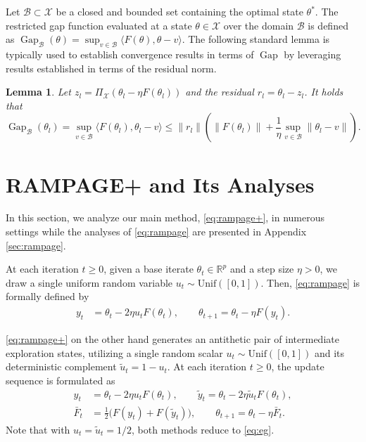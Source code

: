 \documentclass[letter,11pt]{article}
\newtheorem{lemma}[]{Lemma}
\begin{document}
Let $\mathcal{B} \subset \mathcal{X}$ be a closed and bounded set containing the optimal state $\theta^*$. The restricted gap function evaluated at a state $\theta \in \mathcal{X}$ over the domain $\mathcal{B}$ is defined as $\operatorname{Gap}_{\mathcal{B}}(\theta) = \sup_{v \in \mathcal{B}} \langle F(\theta), \theta - v \rangle$. The following standard lemma \cite{Konnov2001,Facchinei2003,nesterov2007dual} is typically used to establish convergence results in terms of $\operatorname{Gap}$ by leveraging results established in terms of the residual norm.
\begin{lemma}\label{lem:gap}
 Let $z_l = \Pi_{\mathcal{X}}(\theta_l - \eta F(\theta_l))$ and the residual $r_l = \theta_l - z_l$. It holds that
 \begin{equation}
\operatorname{Gap}_{\mathcal{B}}(\theta_l) =\sup_{v \in \mathcal{B}} \langle F(\theta_l), \theta_l - v \rangle\le \|r_l\| \left( \|F(\theta_l)\| + \frac{1}{\eta} \sup_{v \in \mathcal{B}} \|\theta_l - v\| \right).
\end{equation}
\end{lemma}
\section{RAMPAGE+ and Its Analyses}\label{sec:rampage+}
In this section, we analyze our main method, \eqref{eq:rampage+}, in numerous settings while the analyses of \eqref{eq:rampage} are presented in Appendix \ref{sec:rampage}.

At each iteration $t \ge 0$, given a base iterate $\theta_t \in \mathbb{R}^p$ and a step size $\eta > 0$, we draw a single uniform random variable $u_t \sim \mathrm{Unif}([0, 1])$. Then, \eqref{eq:rampage} is formally defined by
\begin{equation} \label{eq:rampage}
\tag{RAMPAGE}
\begin{aligned}
y_t &= \theta_t - 2\eta u_t F(\theta_t), \qquad
\theta_{t+1} = \theta_t - \eta F(y_t).
\end{aligned}
\end{equation}

\eqref{eq:rampage+} on the other hand generates an antithetic pair of intermediate exploration states, utilizing a single random scalar $u_t \sim \mathrm{Unif}([0,1])$ and its deterministic complement $\tilde{u}_t = 1 - u_t$. At each iteration $t \ge 0$, the update sequence is formulated as
\begin{equation} \label{eq:rampage+}
\tag{RAMPAGE+}
\begin{aligned}
y_t &= \theta_t - 2\eta u_t F(\theta_t), \qquad
\tilde{y}_t = \theta_t - 2\eta \tilde{u}_t F(\theta_t), \\
\bar{F}_t &= \frac{1}{2} \big( F(y_t) + F(\tilde{y}_t) \big), \qquad
\theta_{t+1} = \theta_t - \eta \bar{F}_t.
\end{aligned}
\end{equation}
Note that with $u_t = \tilde{u}_t = 1/2$, both methods reduce to \eqref{eq:eg}.
\end{document}
